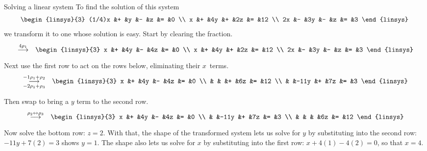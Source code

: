 \documentclass[10pt,t,serif]{beamer}
\begin{document}
\begin{frame}{Solving a linear system}
\ex 
To find the solution of this system
\begin{equation*}
  \begin{linsys}{3}
   (1/4)x  &+  &y  &-  &z  &=  &0  \\
        x  &+  &4y &+  &2z &=  &12  \\
       2x  &-  &3y &-  &z  &=  &3  
  \end{linsys}  
\end{equation*}
we transform it to one whose solution is easy.
\pause Start by clearing the fraction.
\begin{eqnarray*}
  &\grstep{4\rho_1}
  &\begin{linsys}{3}
        x  &+  &4y &-  &4z  &=  &0  \\
        x  &+  &4y &+  &2z &=  &12  \\
       2x  &-  &3y &-  &z  &=  &3  
  \end{linsys}  
\end{eqnarray*}
\pause Next use the first row to act on the rows below, 
eliminating their $x$~terms.
\begin{eqnarray*}
  &\grstep[-2\rho_1+\rho_3]{-1\rho_1+\rho_2}
  &\begin{linsys}{3}
        x  &+  &4y   &-  &4z  &=  &0  \\
           &   &     &+  &6z  &=  &12  \\
           &   &-11y &+  &7z  &=  &3  
  \end{linsys} 
\end{eqnarray*} 
\end{frame}\begin{frame}
Then swap to bring a $y$ term to the second row.
\begin{eqnarray*}
  &\grstep{\rho_2\leftrightarrow\rho_3}
  &\begin{linsys}{3}
        x  &+  &4y   &-  &4z  &=  &0  \\
           &   &-11y &+  &7z  &=  &3  \\
           &   &     &   &6z  &=  &12  
  \end{linsys}  
\end{eqnarray*}
\pause Now solve the bottom row:
$z=2$.
\pause
With that, the shape of the transformed system 
lets us solve for $y$ by substituting into the second row:
$-11y+7(2)=3$ shows $y=1$.
\pause
The shape also lets us solve for $x$ by substituting into the
first row: $x+4(1)-4(2)=0$, so that $x=4$. 

\pause
\df[df:EchelonForm]
\end{frame}
\end{document}
